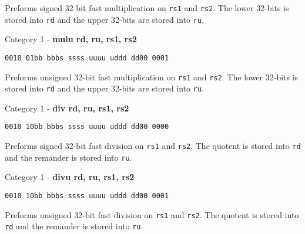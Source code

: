\documentclass{article}
\begin{document}
\begin{flushleft}
Preforms signed 32-bit fast multiplication on \verb|rs1| and \verb|rs2|.
The lower 32-bits is stored into \verb|rd| and the upper 32-bits are stored into \verb|ru|.
\newline\newline
\begin{large}Category 1 - \textbf{mulu rd, ru, rs1, rs2}\end{large}
\begin{verbatim}0010 01bb bbbs ssss uuuu uddd dd00 0001\end{verbatim}
Preforms unsigned 32-bit fast multiplication on \verb|rs1| and \verb|rs2|.
The lower 32-bits is stored into \verb|rd| and the upper 32-bits are stored into \verb|ru|.
\newline\newline
\begin{large}Category 1 - \textbf{div rd, ru, rs1, rs2}\end{large}
\begin{verbatim}0010 10bb bbbs ssss uuuu uddd dd00 0000\end{verbatim}
Preforms signed 32-bit fast division on \verb|rs1| and \verb|rs2|.
The quotent is stored into \verb|rd| and the remander is stored into \verb|ru|.
\newline\newline
\begin{large}Category 1 - \textbf{divu rd, ru, rs1, rs2}\end{large}
\begin{verbatim}0010 10bb bbbs ssss uuuu uddd dd00 0001\end{verbatim}
Preforms unsigned 32-bit fast division on \verb|rs1| and \verb|rs2|.
The quotent is stored into \verb|rd| and the remander is stored into \verb|ru|.
\pagebreak


\end{flushleft}
\end{document}
